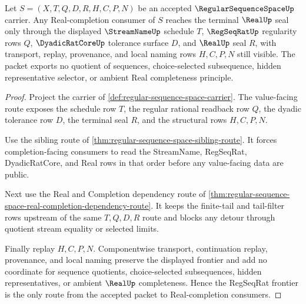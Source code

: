 \begin{theorem}
\label{thm:regular-sequence-space-regseqrat-frontier}
Let $S=(X,T,Q,D,R,H,C,P,N)$ be an accepted $\RegularSequenceSpaceUp$ carrier. Any Real-completion consumer of $S$ reaches the terminal $\RealUp$ seal only through the displayed $\StreamNameUp$ schedule $T$, $\RegSeqRatUp$ regularity rows $Q$, $\DyadicRatCoreUp$ tolerance surface $D$, and $\RealUp$ seal $R$, with transport, replay, provenance, and local naming rows $H,C,P,N$ still visible. The packet exports no quotient of sequences, choice-selected subsequence, hidden representative selector, or ambient Real completeness principle.
\end{theorem}
\begin{proof}
Project the carrier of \autoref{def:regular-sequence-space-carrier}. The value-facing route exposes the schedule row $T$, the regular rational readback row $Q$, the dyadic tolerance row $D$, the terminal seal $R$, and the structural rows $H,C,P,N$.

Use the sibling route of \autoref{thm:regular-sequence-space-sibling-route}. It forces completion-facing consumers to read the StreamName, RegSeqRat, DyadicRatCore, and Real rows in that order before any value-facing data are public.

Next use the Real and Completion dependency route of \autoref{thm:regular-sequence-space-real-completion-dependency-route}. It keeps the finite-tail and tail-filter rows upstream of the same $T,Q,D,R$ route and blocks any detour through quotient stream equality or selected limits.

Finally replay $H,C,P,N$. Componentwise transport, continuation replay, provenance, and local naming preserve the displayed frontier and add no coordinate for sequence quotients, choice-selected subsequences, hidden representatives, or ambient $\RealUp$ completeness. Hence the RegSeqRat frontier is the only route from the accepted packet to Real-completion consumers.
\end{proof}

